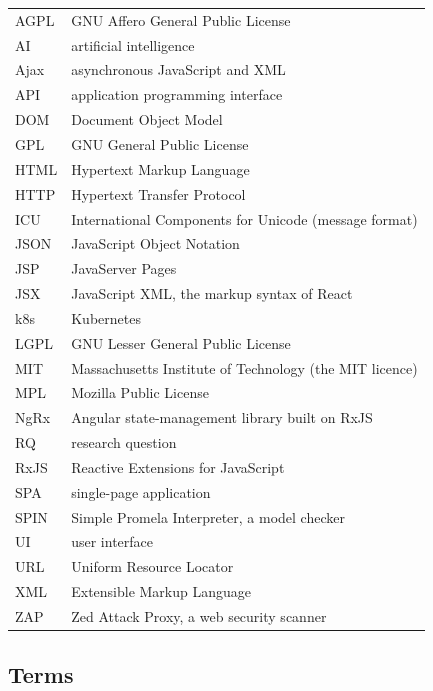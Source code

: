 \documentclass[english,12pt,a4paper,sci,utf8,a-2b,online]{aaltothesis}
\numberwithin{table}{section}
\numberwithin{figure}{section}
\numberwithin{equation}{section}
\begin{document}
\begin{tabular}{@{}ll@{}}
AGPL & GNU Affero General Public License \\
AI & artificial intelligence \\
Ajax & asynchronous JavaScript and XML \\
API & application programming interface \\
DOM & Document Object Model \\
GPL & GNU General Public License \\
HTML & Hypertext Markup Language \\
HTTP & Hypertext Transfer Protocol \\
ICU & International Components for Unicode (message format) \\
JSON & JavaScript Object Notation \\
JSP & JavaServer Pages \\
JSX & JavaScript XML, the markup syntax of React \\
k8s & Kubernetes \\
LGPL & GNU Lesser General Public License \\
MIT & Massachusetts Institute of Technology (the MIT licence) \\
MPL & Mozilla Public License \\
NgRx & Angular state-management library built on RxJS \\
RQ & research question \\
RxJS & Reactive Extensions for JavaScript \\
SPA & single-page application \\
SPIN & Simple Promela Interpreter, a model checker \\
UI & user interface \\
URL & Uniform Resource Locator \\
XML & Extensible Markup Language \\
ZAP & Zed Attack Proxy, a web security scanner \\
\end{tabular}

\subsection*{Terms}
\end{document}
